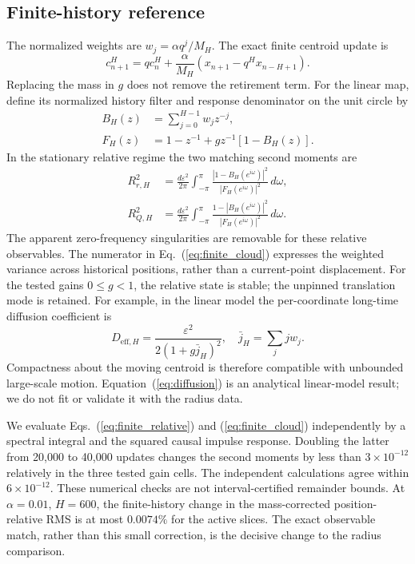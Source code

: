 \subsection{Finite-history reference}
The normalized weights are $w_j=\alpha q^j/M_H$. The exact finite
centroid update is
\begin{equation}
c_{n+1}^H=qc_n^H+\frac{\alpha}{M_H}
\left(x_{n+1}-q^H x_{n-H+1}\right).
\label{eq:finite_center}
\end{equation}
Replacing the mass in $g$ does not remove the retirement term. For the
linear map, define its normalized history filter and response denominator
on the unit circle by
\begin{align}
B_H(z)&=\sum_{j=0}^{H-1}w_jz^{-j},\\
F_H(z)&=1-z^{-1}+g z^{-1}[1-B_H(z)].
\label{eq:filter}
\end{align}
In the stationary relative regime the two matching second moments are
\begin{align}
R_{r,H}^2&=\frac{d\varepsilon^2}{2\pi}
\int_{-\pi}^{\pi}\frac{|1-B_H(e^{i\omega})|^2}
{|F_H(e^{i\omega})|^2}\,d\omega,\label{eq:finite_relative}\\
R_{Q,H}^2&=\frac{d\varepsilon^2}{2\pi}
\int_{-\pi}^{\pi}\frac{1-|B_H(e^{i\omega})|^2}
{|F_H(e^{i\omega})|^2}\,d\omega.
\label{eq:finite_cloud}
\end{align}
The apparent zero-frequency singularities are removable for these relative
observables. The numerator in Eq.~(\ref{eq:finite_cloud}) expresses the
weighted variance across historical positions, rather than a current-point
displacement. For the tested gains $0\leq g<1$, the relative state is stable;
the unpinned translation mode is retained. For example, in the linear model
the per-coordinate long-time diffusion coefficient is
\begin{equation}
D_{\mathrm{eff},H}=\frac{\varepsilon^2}{2(1+g\bar j_H)^2},
\quad\bar j_H=\sum_j j w_j.
\label{eq:diffusion}
\end{equation}
Compactness about the moving centroid is therefore compatible with
unbounded large-scale motion. Equation~(\ref{eq:diffusion}) is an analytical
linear-model result; we do not fit or validate it with the radius data.

We evaluate Eqs.~(\ref{eq:finite_relative}) and (\ref{eq:finite_cloud})
independently by a spectral integral and the squared causal impulse
response. Doubling the latter from 20,000 to 40,000 updates changes the
second moments by less than $3\times10^{-12}$ relatively in the three
tested gain cells. The independent calculations agree within
$6\times10^{-12}$. These numerical checks are not interval-certified
remainder bounds. At $\alpha=0.01$, $H=600$, the finite-history change in
the mass-corrected position-relative RMS is at most $0.0074\%$ for the
active slices. The exact observable match, rather than this small correction,
is the decisive change to the radius comparison.


